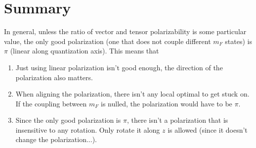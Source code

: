 \documentclass[10pt,fleqn]{article}
\begin{document}
\section{Summary}
\label{summary}
In general, unless the ratio of vector and tensor polarizability
is some particular value, the only good polarization
(one that does not couple different $m_F$ states) is $\pi$
(linear along quantization axis). This means that
\begin{enumerate}
\item Just using linear polarization isn't good enough,
  the direction of the polarization also matters.
\item When aligning the polarization, there isn't any local optimal to get stuck on.
  If the coupling between $m_F$ is nulled, the polarization would have to be $\pi$.
\item Since the only good polarization is $\pi$,
  there isn't a polarization that is insensitive to any rotation.
  Only rotate it along $z$ is allowed (since it doesn't change the polarization...).
\end{enumerate}
\end{document}
